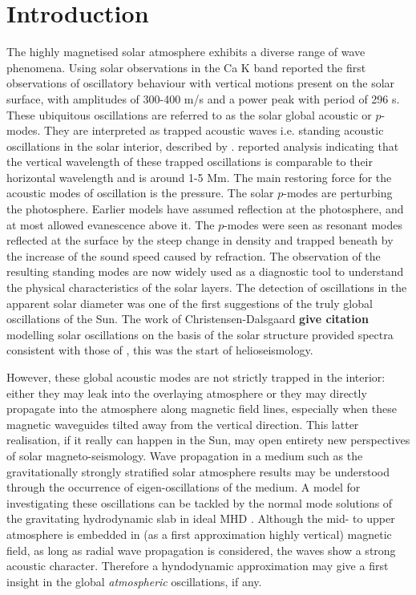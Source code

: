 \documentclass[preprint,authoryear,12pt]{elsarticle}
\begin{document}
\section{Introduction}
The highly magnetised solar atmosphere exhibits a diverse range of wave phenomena. Using solar observations in the Ca K band \citet{Leighton1960} reported the first observations of oscillatory behaviour with vertical motions present on the solar surface, with amplitudes of 300-400 m/s and a power peak with period of 296 s. These ubiquitous oscillations are referred to as the solar global acoustic or $p$-modes.  They are interpreted as trapped acoustic waves i.e. standing acoustic oscillations in the solar interior, described by \citet{Ulrich1970}. \citet{Leibacher1971} reported analysis indicating that the vertical wavelength of these trapped oscillations is comparable to their horizontal wavelength and is around 1-5 Mm. The main restoring force for the acoustic modes of oscillation is the pressure. The solar $p$-modes are perturbing the photosphere. Earlier models have assumed reflection at the photosphere, and at most allowed evanescence above it. The $p$-modes were seen as resonant modes reflected at the surface by the steep change in density and trapped beneath by the increase of the sound speed caused by refraction. The observation of the resulting standing modes are now widely used as a diagnostic tool to understand the physical characteristics of the  solar layers. The detection of oscillations in the apparent solar diameter \citep[see e.g][]{Hill1976, Brown1978} was one of the first suggestions of the truly global oscillations of the Sun. The work of Christensen-Dalsgaard {\bf give citation} modelling solar oscillations on the basis of the solar structure provided spectra consistent with those of \citet{Hill1976, Brown1978}, this was the start of helioseismology. 

However, these global acoustic modes are not strictly trapped in the interior: either they may leak into the overlaying atmosphere or they may directly propagate into the atmosphere along magnetic field lines, especially when these magnetic waveguides tilted away from the vertical direction. This latter realisation, if it really can happen in the Sun, may open entirety new perspectives of solar magneto-seismology.  Wave propagation in a medium such as the gravitationally strongly stratified solar atmosphere results may be understood through the occurrence of eigen-oscillations of the medium. A model for investigating these oscillations can be tackled by the normal mode solutions of the gravitating  hydrodynamic slab in ideal MHD \citet{Goedbloed2004}. Although the mid- to upper atmosphere is embedded in (as a first approximation highly vertical) magnetic field, as long as radial wave propagation is considered, the waves show a strong acoustic character. Therefore a hyndodynamic approximation may give a first insight in the global {\it atmospheric} oscillations, if any. 
\end{document}
